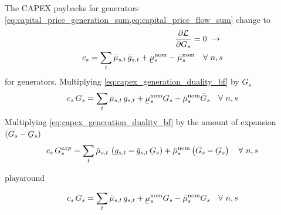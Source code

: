 \documentclass[11pt,twocolumn]{article}
\newcommand{\ubar}[1]{\underaccent{\bar}{#1}}
\newcommand{\Forall}[1]{\hspace{10pt} \forall \,\, #1 }
\newcommand{\pdv}[2]{\frac{\partial #1}{\partial #2}}
\newcommand{\generation}{g_{s,t}}
\newcommand{\generationpotential}{\bar{g}_{s,t}}
\newcommand{\capacityGeneration}{G_{s}}
\newcommand{\capacityGenerationUpper}{\bar{G}_{s}}
\newcommand{\capacityGenerationLower}{\ubar{G}_{s}}
\newcommand{\capacityFlow}{F_{\ell}}
\newcommand{\capexGeneration}{c_{s}}
\newcommand{\capexFlow}{c_{\ell}}
\newcommand{\muuppergeneration}{\bar{\mu}_{s,t}}
\newcommand{\muuppergenerationnom}{\bar{\mu}^\text{nom}_{s}}
\newcommand{\mulowergenerationnom}{\ubar{\mu}^\text{nom}_{s}}
\newcommand{\mulowerflow}{\ubar{\mu}_{\ell,t}}
\newcommand{\muupperflow}{\bar{\mu}_{\ell,t}}
\newcommand{\muupperflownom}{\bar{\mu}^\text{nom}_{\ell}}
\newcommand{\mulowerflownom}{\ubar{\mu}^\text{nom}_{\ell}}
\newcommand{\lagrangian}{\mathcal{L}}
\begin{document}
The CAPEX paybacks for generators %
\cref{eq:capital_price_generation_sum,eq:capital_price_flow_sum} change to 
\begin{align}
\pdv{\lagrangian}{\capacityGeneration}  = 0 \,\, \rightarrow \,\, \\
\capexGeneration =  \sum_t \muuppergeneration \, \generationpotential + \mulowergenerationnom - \muuppergenerationnom \Forall{n,s}
\label{eq:capex_generation_duality_bf}
\end{align}
for generators. %
Multiplying \cref{eq:capex_generation_duality_bf} by $ \capacityGeneration$ 
\begin{align}
 \capexGeneration \, \capacityGeneration =  \sum_t \muuppergeneration \, \generation +  \mulowergenerationnom \capacityGenerationLower - \muuppergenerationnom \capacityGenerationUpper \Forall{n,s}
\end{align}
Multiplying \cref{eq:capex_generation_duality_bf} by the amount of expansion $\left( \capacityGeneration - \capacityGenerationLower \right) $
\begin{align}
  \capexGeneration \, \capacityGeneration^{exp} =  \sum_t \muuppergeneration \, \left( \generation - \generationpotential \, \capacityGenerationLower \right) + \muuppergenerationnom \left( \capacityGenerationUpper - \capacityGenerationLower \right) \Forall{n,s}
\end{align}


playaround 

\begin{align}
\capexGeneration \, \capacityGeneration =  \sum_t \muuppergeneration \, \generation +  \mulowergenerationnom \capacityGeneration - \muuppergenerationnom \capacityGeneration \Forall{n,s}
\end{align}


\clearpage
\printbibliography
\end{document}
